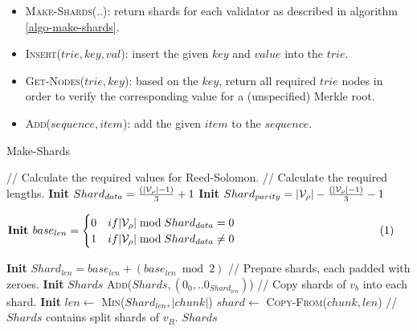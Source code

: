 \begin{itemize}
  \item \textsc{Make-Shards(..)}: return shards for each validator as
  described in algorithm \ref{algo-make-shards}.
  \item \textsc{Insert($trie,key,val$)}: insert the given $key$ and $value$ into the $trie$.
  \item \textsc{Get-Nodes($trie,key$)}: based on the $key$, return all required $trie$ nodes in
  order to verify the corresponding value for a (unspecified) Merkle root.
  \item \textsc{Add($sequence, item$)}: add the given $item$ to the $sequence$.
\end{itemize}

\begin{algorithm}[H]
  \caption[]{\sc Make-Shards}
  \label{algo-make-shards}
  \begin{algorithmic}[1]
    \Statex // Calculate the required values for Reed-Solomon.
    \Statex // Calculate the required lengths.
    \State \textbf{Init} $Shard_{data} = \frac{(|\mathcal{V}_\rho| - 1)}{3} + 1$
    \State \textbf{Init} $Shard_{parity} = |\mathcal{V}_\rho| - \frac{(|\mathcal{V}_\rho| - 1)}{3} - 1$
    \State $\vcenter{
      \begin{flalign*}
        &\textbf{Init } base_{len} =
        \begin{cases}
          0 & if |\paraValidSet| \bmod{Shard_{data}} = 0 \\
          1 & if |\paraValidSet| \bmod{Shard_{data}} \neq 0
        \end{cases}&
      \end{flalign*}
    }$
    \State \textbf{Init} $Shard_{len} = base_{len} + (base_{len} \bmod{2})$
    \Statex
    \Statex // Prepare shards, each padded with zeroes.
    \State \textbf{Init} $Shards$
      \State \textsc{Add}($Shards, (0_0, ..0_{Shard_{len}})$)
    \EndFor
    \Statex
    \Statex // Copy shards of $v_b$ into each shard.
      \State \textbf{Init} $len \leftarrow$ \textsc{Min}($Shard_{len}, |chunk|$)
      \State $shard \leftarrow$ \textsc{Copy-From}($chunk, len$)
    \EndFor
    \Statex
    \Statex // $Shards$ contains split shards of $v_B$.
    \State \Return $Shards$
  \end{algorithmic}
\end{algorithm}

